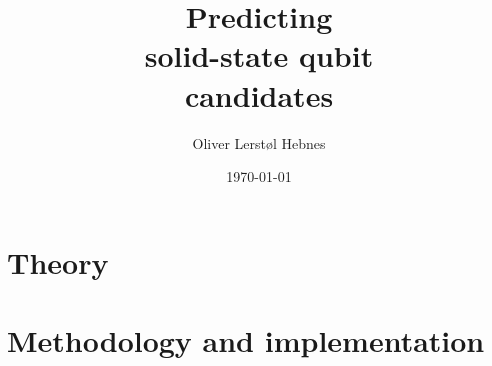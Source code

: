 \documentclass[twoside, english, notitlepage, 12pt]{uiofysmaster}
\author{Oliver Lerstøl Hebnes}
\title{Predicting\\
solid-state qubit\\
candidates
}
\date{\today}
\begin{document}
\hypersetup{pageanchor=false}
\frontmatter
    \maketitle



    \setcounter{tocdepth}{1}
    \tableofcontents

\mainmatter

    \part{Theory}
        
        

        

    \part{Methodology and implementation}
        

\end{document}
